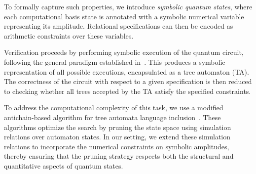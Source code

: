 To formally capture such properties, we introduce \emph{symbolic quantum states}, where each computational basis state is annotated with a symbolic numerical variable representing its amplitude. Relational specifications can then be encoded as arithmetic constraints over these variables.

Verification proceeds by performing symbolic execution of the quantum circuit, following the general paradigm established in~\citep{10.1145/360248.360252}. This produces a symbolic representation of all possible executions, encapsulated as a tree automaton (TA). The correctness of the circuit with respect to a given specification is then reduced to checking whether all trees accepted by the TA satisfy the specified constraints.

To address the computational complexity of this task, we use a modified antichain-based algorithm for tree automata language inclusion~\citep{DBLP:conf/tacas/AbdullaCHMV10}. These algorithms optimize the search by pruning the state space using simulation relations over automaton states. In our setting, we extend these simulation relations to incorporate the numerical constraints on symbolic amplitudes, thereby ensuring that the pruning strategy respects both the structural and quantitative aspects of quantum states.


%
%

%
%

%
%
%
%
%



